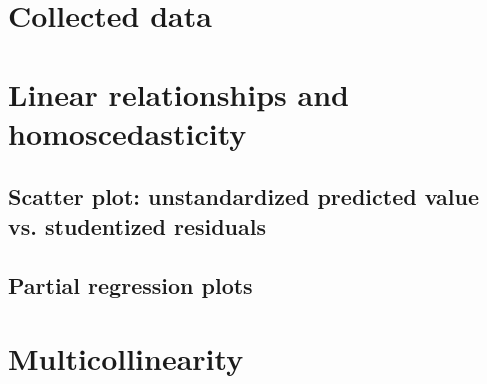 \documentclass{sigchi}
\begin{document}








\clearpage
\onecolumn

\appendix
\section{Collected data} %
\label{sec:collected_data}


\section{Linear relationships and homoscedasticity}
\label{app:linear_relationships}

\subsection{Scatter plot: unstandardized predicted value vs. studentized residuals}
\hfill \break

\clearpage

\subsection{Partial regression plots}
\hfill \break


\clearpage

\section{Multicollinearity} %
\label{app:multicollinearity}
\hfill \break

\clearpage
\end{document}

